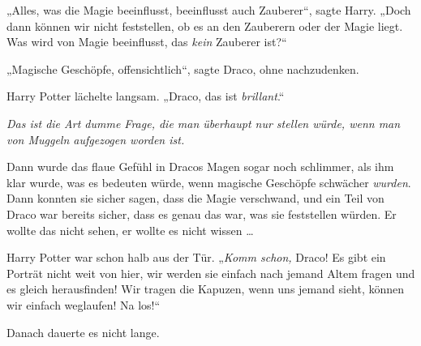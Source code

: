 „Alles, was die Magie beeinflusst, beeinflusst auch Zauberer“, sagte Harry.
„Doch dann können wir nicht feststellen, ob es an den Zauberern oder der Magie liegt. Was wird von Magie beeinflusst, das \emph{kein} Zauberer ist?“

„Magische Geschöpfe, offensichtlich“, sagte Draco, ohne nachzudenken.

Harry Potter lächelte langsam.
„Draco, das ist \emph{brillant}.“

\emph{Das ist die Art dumme Frage, die man überhaupt nur stellen würde, wenn man von Muggeln aufgezogen worden ist.}

Dann wurde das flaue Gefühl in Dracos Magen sogar noch schlimmer, als ihm klar wurde, was es bedeuten würde, wenn magische Geschöpfe schwächer \emph{wurden}. Dann konnten sie sicher sagen, dass die Magie verschwand, und ein Teil von Draco war bereits sicher, dass es genau das war, was sie feststellen würden. Er wollte das nicht sehen, er wollte es nicht wissen …

Harry Potter war schon halb aus der Tür.
„\emph{Komm schon,} Draco! Es gibt ein Porträt nicht weit von hier, wir werden sie einfach nach jemand Altem fragen und es gleich herausfinden! Wir tragen die Kapuzen, wenn uns jemand sieht, können wir einfach weglaufen! Na los!“

\later

Danach dauerte es nicht lange.

